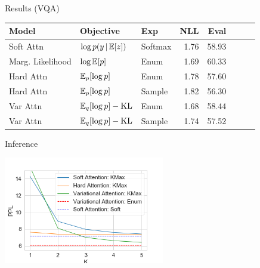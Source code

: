 \begin{frame}{Results (VQA)}
\begin{table}
  \centering
  \begin{tabular}{lllrrrrr}
    \toprule
    Model & Objective & Exp  & NLL &  Eval \\
    \midrule
  Soft Attn & $\log p(y \,|\, \mathbb{E}[z])$ & Softmax & 1.76 & 58.93 \\
  Marg. Likelihood & $\log \mathbb{E}[p]$ &  Enum & 1.69  &60.33\\
  Hard Attn  & $\mathbb{E}_p[\log p]$ & Enum & 1.78 &  57.60\\
  Hard Attn  & $\mathbb{E}_p[\log p]$  & Sample &  1.82 &   56.30\\
  Var Attn  & $\mathbb{E}_q[\log p] - \operatorname*{KL}$ & Enum & 1.68 &  58.44 \\
  Var Attn &  $\mathbb{E}_q[\log p] - \operatorname*{KL}$ &Sample& 1.74 &  57.52 \\
    \bottomrule
  \end{tabular}

   \label{tab:eval_nmt}
\end{table}
\end{frame}


\begin{frame}{Inference}
\begin{center}
\includegraphics[width=7cm]{sample}
\end{center}
\end{frame}

